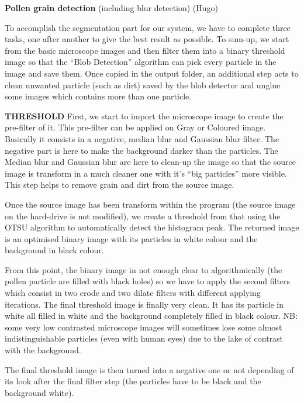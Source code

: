 \textbf{Pollen grain detection} (including blur detection) (Hugo)

To accomplish the segmentation part for our system, we have to complete three tasks, one after another to give the best result as possible.
	To sum-up, we start from the basic microscope images and then filter them into a binary threshold image so that the “Blob Detection” algorithm can pick every particle in the image and save them. Once copied in the output folder, an additional step acts to clean unwanted particle (such as dirt) saved by the blob detector and unglue some images which contains more than one particle.

\textbf{THRESHOLD}
	First, we start to import the microscope image to create the pre-filter of it. This pre-filter can be applied on Gray or Coloured image. Basically it consists in a negative, median blur and Gaussian blur filter. The negative part is here to make the background darker than the particles. The Median blur and Gaussian blur are here to clean-up the image so that the source image is transform in a much cleaner one with it's “big particles” more visible. This step helps to remove grain and dirt from the source image.
	
	Once the source image has been transform within the program (the source image on the hard-drive is not modified), we create a threshold from that using the OTSU algorithm to automatically detect the histogram peak. The returned image is an optimised binary image with its particles in white colour and the background in black colour.
	
	From this point, the binary image in not enough clear to algorithmically (the pollen particle are filled with black holes) so we have to apply the second filters which consist in two erode and two dilate filters with different applying iterations. The final threshold image is finally very clean. It has its particle in white all filled in white and the background completely filled in black colour. NB: some very low contrasted microscope images will sometimes lose some almost indistinguishable particles (even with human eyes) due to the lake of contrast with the background.
	
	The final threshold image is then turned into a negative one or not depending of its look after the final filter step (the particles have to be black and the background white).
    
    